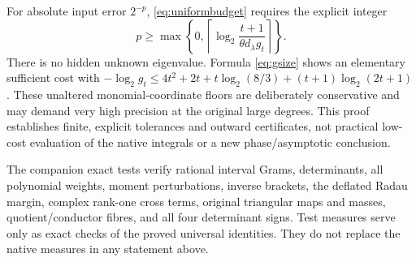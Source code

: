 \documentclass[11pt]{article}
\begin{document}
For absolute input error $2^{-p}$, \eqref{eq:uniformbudget}
requires the explicit integer
\[
 p\ge\max\left\{0,
 \left\lceil\log_2\frac{t+1}{\theta d_\lambda g_t}\right\rceil
 \right\}.
\]
There is no hidden unknown eigenvalue. Formula \eqref{eq:gsize}
shows an elementary sufficient cost with
$-\log_2g_t\le4t^2+2t+t\log_2(8/3)
 +(t+1)\log_2(2t+1)$.
These unaltered monomial-coordinate floors are deliberately
conservative and may demand very high precision at the original
large degrees. This proof establishes finite, explicit tolerances
and outward certificates, not practical low-cost evaluation of
the native integrals or a new phase/asymptotic conclusion.

The companion exact tests verify rational interval Grams,
determinants, all polynomial weights, moment perturbations, inverse
brackets, the deflated Radau margin, complex rank-one cross terms,
original triangular maps and masses, quotient/conductor fibres,
and all four determinant signs. Test measures serve only as exact
checks of the proved universal identities. They do not replace the
native measures in any statement above.
\end{document}
